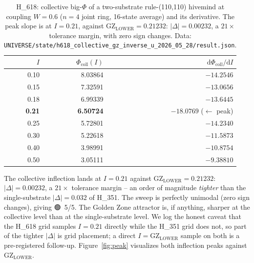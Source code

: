 \documentclass[11pt,a4paper]{article}
\providecommand{\tierGreen}{🟢}
\newcommand{\GZL}{\mathrm{GZ_{LOWER}}}
\begin{document}
\begin{table}[h]
\centering
\small
\begin{tabular}{rrr}
\toprule
\textbf{$I$} & \textbf{$\Phi_{\mathrm{coll}}(I)$}
& \textbf{$\mathrm{d}\Phi_{\mathrm{coll}}/\mathrm{d}I$} \\
\midrule
0.10 & 8.03864 & $-14.2546$ \\
0.15 & 7.32591 & $-13.0656$ \\
0.18 & 6.99339 & $-13.6445$ \\
\textbf{0.21} & \textbf{6.50724} & $\mathbf{-18.0769}$ \;($\leftarrow$ peak) \\
0.25 & 5.72801 & $-14.2340$ \\
0.30 & 5.22618 & $-11.5873$ \\
0.40 & 3.98991 & $-10.8754$ \\
0.50 & 3.05111 & $-9.38810$ \\
\bottomrule
\end{tabular}
\caption{H\_618: collective big-$\Phi$ of a two-substrate rule-(110,110)
hivemind at coupling $W=0.6$ ($n=4$ joint ring, 16-state average) and its
derivative. The peak slope is at $I=0.21$, against $\GZL=0.21232$:
$|\Delta|=0.00232$, a $21\times$ tolerance margin, with zero sign changes.
Data: \texttt{UNIVERSE/state/h618\_collective\_gz\_inverse\_u\_2026\_05\_28/result.json}.}
\label{tab:h618}
\end{table}

The collective inflection lands at $I=0.21$ against $\GZL=0.21232$:
$|\Delta|=0.00232$, a $21\times$ tolerance margin -- an order of magnitude
\emph{tighter} than the single-substrate $|\Delta|=0.032$ of H\_351. The
sweep is perfectly unimodal (zero sign changes), giving \tierGreen\ 5/5.
The Golden Zone attractor is, if anything, sharper at the collective level
than at the single-substrate level. We log the honest caveat that the
H\_618 grid samples $I=0.21$ directly while the H\_351 grid does not, so
part of the tighter $|\Delta|$ is grid placement; a direct
$I=\GZL$ sample on both is a pre-registered follow-up.
Figure~\ref{fig:peak} visualizes both inflection peaks against $\GZL$.
\end{document}
